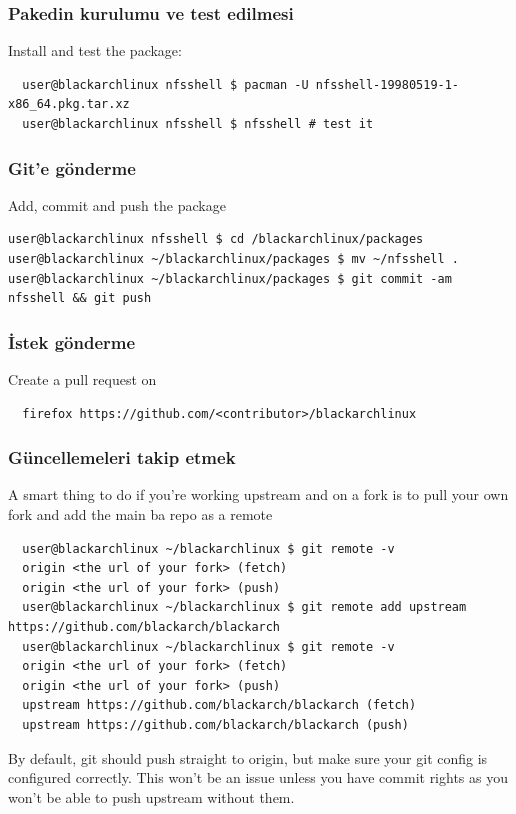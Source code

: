 \documentclass[a4paper, oneside, 11pt]{book}
\def\href#1#2{\htmladdnormallink{#2}{#1}}
\begin{document}
\subsubsection{Pakedin kurulumu ve test edilmesi}
Install and test the package:
\begin{lstlisting}
  user@blackarchlinux nfsshell $ pacman -U nfsshell-19980519-1-x86_64.pkg.tar.xz
  user@blackarchlinux nfsshell $ nfsshell # test it
\end{lstlisting}

\subsubsection{Git'e gönderme}
Add, commit and push the package
\begin{lstlisting}user@blackarchlinux nfsshell $ cd /blackarchlinux/packages
user@blackarchlinux ~/blackarchlinux/packages $ mv ~/nfsshell .
user@blackarchlinux ~/blackarchlinux/packages $ git commit -am nfsshell && git push
\end{lstlisting}

\subsubsection{İstek gönderme}
Create a pull request on \href{https://github.com/}{github.com}
\begin{lstlisting}
  firefox https://github.com/<contributor>/blackarchlinux
\end{lstlisting}

\subsubsection{Güncellemeleri takip etmek}
A smart thing to do if you're working upstream and on a fork is to pull your own fork and add the main ba repo as a remote
\begin{lstlisting}
  user@blackarchlinux ~/blackarchlinux $ git remote -v
  origin <the url of your fork> (fetch)
  origin <the url of your fork> (push)
  user@blackarchlinux ~/blackarchlinux $ git remote add upstream https://github.com/blackarch/blackarch
  user@blackarchlinux ~/blackarchlinux $ git remote -v
  origin <the url of your fork> (fetch)
  origin <the url of your fork> (push)
  upstream https://github.com/blackarch/blackarch (fetch)
  upstream https://github.com/blackarch/blackarch (push)
\end{lstlisting}

By default, git should push straight to origin, but make sure your git config is
configured correctly. This won't be an issue unless you have commit rights as
you won't be able to push upstream without them.
\end{document}
